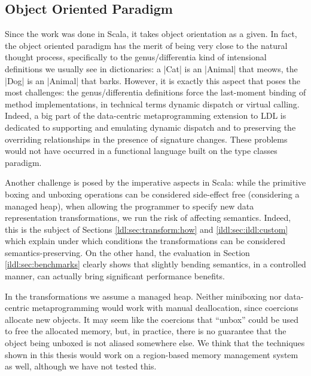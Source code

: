 \subsection{Object Oriented Paradigm}



Since the work was done in Scala, it takes object orientation as a given. In fact, the object oriented paradigm has the merit of being very close to the natural thought process, specifically to the genus/differentia kind of intensional definitions we usually see in dictionaries: a |Cat| is an |Animal| that meows, the |Dog| is an |Animal| that barks. However, it is exactly this aspect that poses the most challenges: the genus/differentia definitions force the last-moment binding of method implementations, in technical terms dynamic dispatch or virtual calling. Indeed, a big part of the data-centric metaprogramming extension to LDL is dedicated to supporting and emulating dynamic dispatch and to preserving the overriding relationships in the presence of signature changes. These problems would not have occurred in a functional language built on the type classes paradigm.

Another challenge is posed by the imperative aspects in Scala: while the primitive boxing and unboxing operations can be considered side-effect free (considering a managed heap), when allowing the programmer to specify new data representation transformations, we run the risk of affecting semantics. Indeed, this is the subject of Sections \ref{ldl:sec:transform:how} and \ref{ildl:sec:ildl:custom} which explain under which conditions the transformations can be considered semantics-preserving. On the other hand, the evaluation in Section \ref{ildl:sec:benchmarks} clearly shows that slightly bending semantics, in a controlled manner, can actually bring significant performance benefits.

In the transformations we assume a managed heap. Neither miniboxing nor data-centric metaprogramming would work with manual deallocation, since coercions allocate new objects. It may seem like the coercions that ``unbox'' could be used to free the allocated memory, but, in practice, there is no guarantee that the object being unboxed is not aliased somewhere else. We think that the techniques shown in this thesis would work on a region-based \cite{regions} memory management system as well, although we have not tested this.

